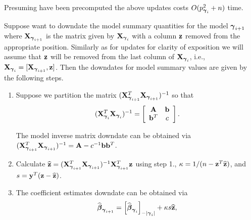 \documentclass{article}[12pt]
\begin{document}
\noindent Presuming  have been precomputed
the above updates costs $O(p_{{\boldsymbol \gamma}_{i}}^2 + n)$ time.

Suppose want to downdate the model summary quantities for the model
${\boldsymbol \gamma}_{i+1}$ where ${\bf X}_{{\boldsymbol \gamma}_{i+1}}$ is the matrix given by 
${\bf X}_{{\boldsymbol \gamma}_i}$ with a column ${\bf z}$ removed from the appropriate position.
Similarly as for updates for clarity of exposition we will assume that
${\bf z}$ will be removed from the last column of ${\bf X}_{{\boldsymbol \gamma}_i}$, i.e., 
${\bf X}_{{\boldsymbol \gamma}_{i}} = [{\bf X}_{{\boldsymbol \gamma}_{i+1}}, {\bf z}]$. 
Then the downdates for model summary values are given by the following steps.
\begin{enumerate}
	\item 
	Suppose we partition the matrix
	$({\bf X}_{{\boldsymbol \gamma}_{i+1}}^T{\bf X}_{{\boldsymbol \gamma}_{i+1}})^{-1}$ so that
	$$
	\displaystyle ({\bf X}_{{\boldsymbol \gamma}_{i}}^T{\bf X}_{{\boldsymbol \gamma}_{i}})^{-1} 
	= \left[ \begin{array}{cc}
	{\bf A}   & {\bf b} \\
	{\bf b}^T & c \\
	\end{array} \right].
	$$
	
	\noindent The model inverse matrix downdate can be obtained
	via   $({\bf X}_{{\boldsymbol \gamma}_{i+1}}^T{\bf X}_{{\boldsymbol \gamma}_{i+1}})^{-1} = {\bf A} - c^{-1}{\bf b}{\bf b}^T$.
	
	\item Calculate
	$\widehat{{\bf z}} = ({\bf X}_{{\boldsymbol \gamma}_{i+1}}^T{\bf X}_{{\boldsymbol \gamma}_{i+1}})^{-1}{\bf X}_{{\boldsymbol \gamma}_{i+1}}^T{\bf z}$ using step 1.,
	$\kappa = 1/(n - {\bf z}^T\widehat{{\bf z}})$,
	and $s = {\bf y}^T({\bf z} - \widehat{{\bf z}})$.
	
	\item 
	The coefficient estimates downdate can be obtained
	via
	$$
	\widehat{{\boldsymbol \beta}}_{{\boldsymbol \gamma}_{i+1}} = \left[ \widehat{{\boldsymbol \beta}}_{{\boldsymbol \gamma}_{i}} \right]_{-|{{\boldsymbol \gamma}_{i}}|} + \kappa s\widehat{{\bf z}},
	$$
	

\end{enumerate}
\end{document}
